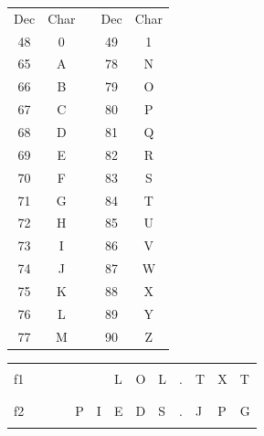 \documentclass[11pt,a4paper]{article}
\begin{document}
\begin{table}[ht!]
  \centering
  \begin{minipage}{0.3\textwidth}
    \centering

\begin{tabular}{ |c|c| m{0.3cm} |c|c| }
\cline{1-2} \cline{4-5}
Dec & Char &   & Dec & Char \\
\cline{1-2} \cline{4-5}
48 & 0 &  & 49 & 1 \\
\cline{1-2} \cline{4-5}
65 & A &  & 78 & N \\
66 & B &  & 79 & O \\
67 & C &  & 80 & P \\
68 & D &  & 81 & Q \\
69 & E &  & 82 & R \\
70 & F &  & 83 & S \\
71 & G &  & 84 & T \\
72 & H &  & 85 & U \\
73 & I &  & 86 & V \\
74 & J &  & 87 & W \\
75 & K &  & 88 & X \\
76 & L &  & 89 & Y \\
77 & M &  & 90 & Z \\
\cline{1-2} \cline{4-5}
\end{tabular}

  \end{minipage}
  \hfillx
  \begin{minipage}{0.65\textwidth}
    \centering

\begin{tabular}{ c   | m{0.45cm} | m{0.45cm} | m{0.45cm} | m{0.45cm} | m{0.45cm} | m{0.45cm} | m{0.45cm} | m{0.45cm} | c | m{0.45cm} | m{0.45cm} | m{0.45cm} | }
\cline{2-9} \cline{11-13}
 & & & & & & & & &   & & & \\
f1   & & & & & &  L  &  O  &  L  &  .  &  T  &  X  &  T  \\
 & & & & & & & & &   & & & \\
\cline{2-9} \cline{11-13}
 & & & & & & & & &   & & & \\
f2   & & & &  P  &  I  &  E  &  D  &  S  &  .  &  J  &  P  &  G  \\
 & & & & & & & & &   & & & \\
\cline{2-9} \cline{11-13}
\end{tabular}

  \end{minipage}
\end{table}
\end{document}
